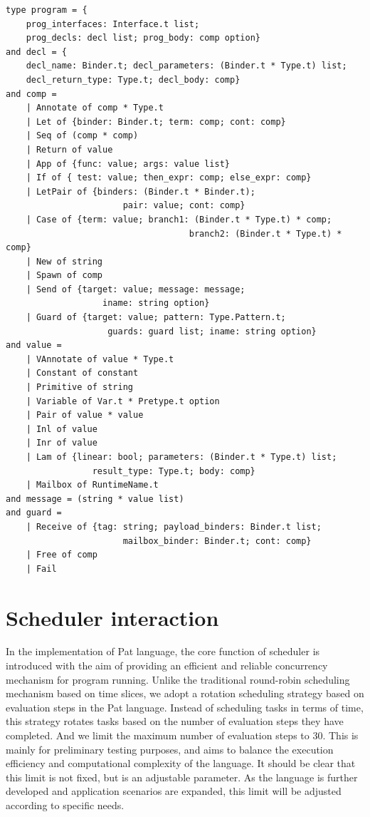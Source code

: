 \documentclass{l4proj}
\begin{document}
\noindent\begin{minipage}{\linewidth}
\lstset{style=Ocamlstyle}
\begin{lstlisting}[caption={AST in Pat(\cite{mbcheck})}, label={lst:framework}]
type program = {
    prog_interfaces: Interface.t list;
    prog_decls: decl list; prog_body: comp option}
and decl = {
    decl_name: Binder.t; decl_parameters: (Binder.t * Type.t) list;
    decl_return_type: Type.t; decl_body: comp}
and comp =
    | Annotate of comp * Type.t
    | Let of {binder: Binder.t; term: comp; cont: comp}
    | Seq of (comp * comp)
    | Return of value
    | App of {func: value; args: value list}
    | If of { test: value; then_expr: comp; else_expr: comp}
    | LetPair of {binders: (Binder.t * Binder.t); 
                       pair: value; cont: comp}
    | Case of {term: value; branch1: (Binder.t * Type.t) * comp; 
                                    branch2: (Binder.t * Type.t) * comp}
    | New of string
    | Spawn of comp
    | Send of {target: value; message: message; 
                   iname: string option}
    | Guard of {target: value; pattern: Type.Pattern.t;
                    guards: guard list; iname: string option}
and value =
    | VAnnotate of value * Type.t
    | Constant of constant
    | Primitive of string
    | Variable of Var.t * Pretype.t option
    | Pair of value * value
    | Inl of value
    | Inr of value
    | Lam of {linear: bool; parameters: (Binder.t * Type.t) list;
                 result_type: Type.t; body: comp}
    | Mailbox of RuntimeName.t
and message = (string * value list)
and guard =
    | Receive of {tag: string; payload_binders: Binder.t list;
                       mailbox_binder: Binder.t; cont: comp}
    | Free of comp
    | Fail

\end{lstlisting}
\end{minipage}

\section{Scheduler interaction}

In the implementation of Pat language, the core function of scheduler is introduced with the aim of providing an efficient and reliable concurrency mechanism for program running. Unlike the traditional round-robin scheduling mechanism based on time slices, we adopt a rotation scheduling strategy based on evaluation steps in the Pat language. Instead of scheduling tasks in terms of time, this strategy rotates tasks based on the number of evaluation steps they have completed. And we limit the maximum number of evaluation steps to 30. This is mainly for preliminary testing purposes, and aims to balance the execution efficiency and computational complexity of the language. It should be clear that this limit is not fixed, but is an adjustable parameter. As the language is further developed and application scenarios are expanded, this limit will be adjusted according to specific needs.
\end{document}
